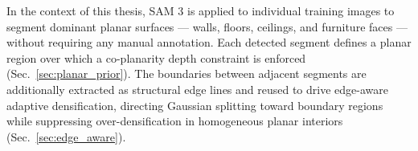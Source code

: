 In the context of this thesis, SAM 3 is applied to individual training images to segment dominant planar surfaces — walls, floors, ceilings, and furniture faces — without requiring any manual annotation. Each detected segment defines a planar region over which a co-planarity depth constraint is enforced (Sec.~\ref{sec:planar_prior}). The boundaries between adjacent segments are additionally extracted as structural edge lines and reused to drive edge-aware adaptive densification, directing Gaussian splitting toward boundary regions while suppressing over-densification in homogeneous planar interiors (Sec.~\ref{sec:edge_aware}).



